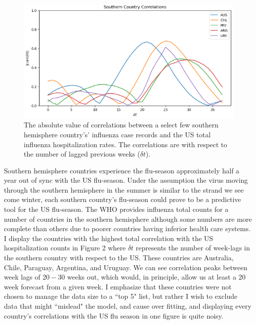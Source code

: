 \documentclass[12pt,a4paper,english]{article}
\begin{document}
\begin{figure}[h!]
		\begin{center}
		\includegraphics[scale=0.75]{Pictures/so_country_corrs.png}
		\caption{The absolute value of correlations between a select few southern hemisphere country's' influenza case records and the US total influenza hospitalization rates. The correlations are with respect to the number of lagged previous weeks ($\delta t$).}
		\end{center}
		\label{fig:so_corrs}
	\end{figure}
\FloatBarrier

Southern hemisphere countries experience the flu-season approximately half a year out of sync with the US flu-season. Under the assumption the virus moving through the southern hemisphere in the summer is similar to the strand we see come winter, each southern country's flu-season could prove to be a predictive tool for the US flu-season. The WHO provides influenza total counts for a number of countries in the southern hemisphere although some numbers are more complete than others due to poorer countries having inferior health care systems. I display the countries with the highest total correlation with the US hospitalization counts in Figure 2 where $\delta t $ represents the number of week-lags in the southern country with respect to the US. These countries are Australia, Chile, Paraguay, Argentina, and Uruguay. We can see correlation peaks between week lags of $20-30$ weeks out, which would, in principle, allow us at least a 20 week forecast from a given week. I  emphasize that these countries were not chosen to manage the data size to a ``top 5" list, but rather I wish to exclude data that might ``mislead" the model, and cause over fitting, and displaying every country's correlations with the US flu season in one figure is quite noisy.
\end{document}
